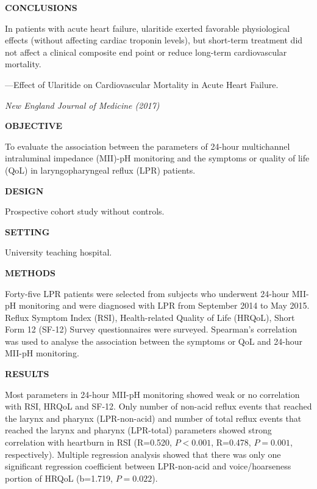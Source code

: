 \documentclass[a4paper]{ctexbook}
\begin{document}
\begin{sample}[label={myautocounter}]{\heiti}
  \textbf{CONCLUSIONS} 
  
  In patients with acute heart failure, ularitide exerted favorable physiological effects (without affecting cardiac troponin levels), but short-term treatment did not affect a clinical composite end point or reduce long-term cardiovascular mortality.

  \begin{flushright}
    ---Effect of Ularitide on Cardiovascular Mortality in Acute Heart Failure.

    \emph{New England Journal of Medicine (2017)}
  \end{flushright}

  
\end{sample}

\begin{sample}[label={myautocounter}]{\heiti}
  \textbf{OBJECTIVE} 
  
  To evaluate the association between the parameters of 24-hour multichannel intraluminal impedance (MII)-pH monitoring and the symptoms or quality of life (QoL) in laryngopharyngeal reflux (LPR) patients.

  \textbf{DESIGN} 
  
  Prospective cohort study without controls.

  \textbf{SETTING} 
  
  University teaching hospital.

  \textbf{METHODS} 
  
  Forty-five LPR patients were selected from subjects who underwent 24-hour MII-pH monitoring and were diagnosed with LPR from September 2014 to May 2015. Reflux Symptom Index (RSI), Health-related Quality of Life (HRQoL), Short Form 12 (SF-12) Survey questionnaires were surveyed. Spearman's correlation was used to analyse the association between the symptoms or QoL and 24-hour MII-pH monitoring.

  \textbf{RESULTS}

  Most parameters in 24-hour MII-pH monitoring showed weak or no correlation with RSI, HRQoL and SF-12. Only number of non-acid reflux events that reached the larynx and pharynx (LPR-non-acid) and number of total reflux events that reached the larynx and pharynx (LPR-total) parameters showed strong correlation with heartburn in RSI (R=0.520, $P<0.001$, R=0.478, $P=0.001$, respectively). Multiple regression analysis showed that there was only one significant regression coefficient between LPR-non-acid and voice/hoarseness portion of HRQoL (b=1.719, $P=0.022$).


\end{sample}
\end{document}
